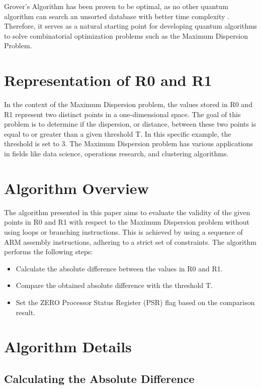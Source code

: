Grover's Algorithm has been proven to be optimal, as no other quantum algorithm can search an unsorted database with better time complexity \cite{bennett1997strengths}. Therefore, it serves as a natural starting point for developing quantum algorithms to solve combinatorial optimization problems such as the Maximum Dispersion Problem.


\section{Representation of R0 and R1}

In the context of the Maximum Dispersion problem, the values stored in R0 and R1 represent two distinct points in a one-dimensional space. The goal of this problem is to determine if the dispersion, or distance, between these two points is equal to or greater than a given threshold T. In this specific example, the threshold is set to 3. The Maximum Dispersion problem has various applications in fields like data science, operations research, and clustering algorithms.

\section{Algorithm Overview}

The algorithm presented in this paper aims to evaluate the validity of the given points in R0 and R1 with respect to the Maximum Dispersion problem without using loops or branching instructions. This is achieved by using a sequence of ARM assembly instructions, adhering to a strict set of constraints. The algorithm performs the following steps:

\begin{itemize}
    \item Calculate the absolute difference between the values in R0 and R1.
    \item Compare the obtained absolute difference with the threshold T.
    \item Set the ZERO Processor Status Register (PSR) flag based on the comparison result.
\end{itemize}

\section{Algorithm Details}

\subsection{Calculating the Absolute Difference}

